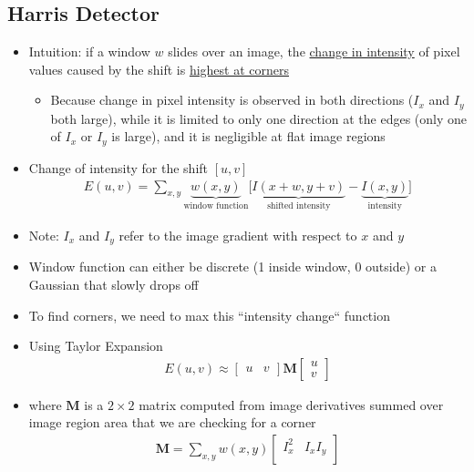 \documentclass[letterpaper,12pt]{article}
\newcommand{\matr}[1]{\mathbf{#1}}
\begin{document}
\subsection{Harris Detector}
\begin{itemize}
 \item Intuition: if a window $w$ slides over an image, the \underline{change in intensity} of pixel values caused by the shift is \underline{highest at corners}
       \begin{itemize}
        \item Because change in pixel intensity is observed in both directions ($I_x$ and $I_y$ both large), while it is limited to only one direction at the edges (only one of $I_x$ or $I_y$ is large), and it is negligible at flat image regions
       \end{itemize}
 \item Change of intensity for the shift $[u,v]$
       \begin{align}
        E(u,v) = \sum\limits_{x,y} \underbrace{w(x,y)}_\text{window function} \bigg[ \underbrace{I(x+w,y+v)}_\text{shifted intensity}-\underbrace{I(x,y)}_\text{intensity}\bigg]
       \end{align}
 \item Note: $I_x$ and $I_y$ refer to the image gradient with respect to $x$ and $y$
 \item Window function can either be discrete (1 inside window, 0 outside) or a Gaussian that slowly drops off
 \item To find corners, we need to max this ``intensity change`` function
 \item Using Taylor Expansion
       \begin{align}
        E(u,v) \approx
        \begin{bmatrix}
         u & v
        \end{bmatrix}
        \matr{M}
        \begin{bmatrix}
         u \\
         v
        \end{bmatrix}
       \end{align}
 \item where $\matr{M}$ is a $2 \times 2$ matrix computed from image derivatives summed over image region area that we are checking for a corner
       \begin{align}
        \matr{M} = \sum\limits_{x,y} w(x,y)
        \begin{bmatrix}
         I^2_x   & I_x I_y \\

\end{bmatrix}
\end{align}
\end{itemize}
\end{document}

